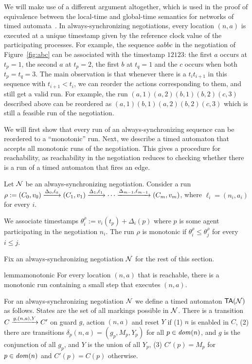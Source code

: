 We will make use of a different argument altogether, which is used in
the proof of equivalence between the local-time and global-time
semantics for networks of timed
automata~\cite{DBLP:conf/concur/BengtssonJLY98,DBLP:conf/concur/GovindHSW19}. In
always-synchronizing negotiations, every location $(n, a)$ is executed
at a unique timestamp given by the reference clock value of the
participating processes. For example, the sequence $aabbc$ in the
negotiation of Figure~\ref{fig:abc} can be associated with the
timestamp $12123$: the first $a$ occurs at $t_p = 1$, the second $a$
at $t_p = 2$, the first $b$ at $t_q = 1$ and the $c$
occurs when both $t_p = t_q = 3$.  The main
observation is that whenever there is a $t_i t_{i+1}$ in this sequence
with $t_{i+1} < t_i$, we can reorder the actions corresponding to
them, and still get a valid run. For example, the run
$(a, 1) (a, 2) (b, 1) (b, 2) (c, 3)$ described above can be reordered
as $(a, 1) (b, 1) (a, 2) (b, 2) (c, 3)$ which is still a feasible run
of the negotiation.

We will first show that every run of an always-synchronizing sequence
can be reordered to a ``monotonic'' run. Next, we describe a timed
automaton that accepts all monotonic runs of the negotiation. This
gives a procedure for reachability, as reachability in the negotiation
reduces to checking whether there is a run of a timed automaton that
fires an edge.

\begin{definition}
  Let $\mathcal{N}$ be an always-synchronizing negotiation. Consider a run
  $\rho:= (C_0, v_0) \xrightarrow{\Delta_0, \ell_0} (C_1, v_1) \xrightarrow{\Delta_1,
    \ell_1} \cdots \xrightarrow{\Delta_{m-1}, \ell_{m-1}} (C_m, v_m)$, where
  $\ell_i = (n_i, a_i)$ for every $i$.

  We associate timestamps $\theta^\rho_i := v_i(t_p) + \Delta_i(p)$
  where $p$ is some agent participating in the negotiation $n_i$.  The
  run $\rho$ is monotonic if $\theta^\rho_i \le \theta^\rho_j$ for
  every $i \le j$.
\end{definition}

Fix an always-synchronizing negotiation $\mathcal{N}$ for the rest of this
section.

\begin{restatable}{lemma}{monotonic}
\label{lem:monotonic}
  For every location $(n,a)$ that is reachable, there is a monotonic
  run containing a small step that executes $(n,a)$.
\end{restatable}


\begin{definition}
  For an always-synchronizing negotiation $\mathcal{N}$ we define a timed
  automaton $\mathsf{TA}(\mathcal{N})$ as follows.  States are the set of all markings
  possible in $\mathcal{N}$. There is a transition $C \xrightarrow{g, (n,a) , Y} C'$
  on guard $g$, action $(n,a)$ and reset $Y$ if (1) $n$ is enabled in
  $C$, (2) there are transitions $\delta_p(n,
  a) = (g_p,M_p, Y_p)$  for all $p \in \mathit{dom}(n)$, and 
  $g$ is the conjunction of all $g_p$, and $Y$ is the union of all
  $Y_p$, (3) $C'(p) = M_p$ for $p \in \mathit{dom}(n)$ and $C'(p) = C(p)$
  otherwise.
\end{definition}

